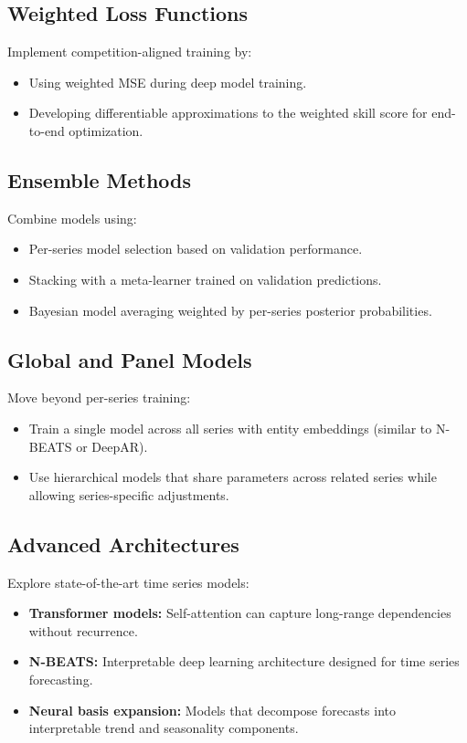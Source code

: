 \subsection{Weighted Loss Functions}
Implement competition-aligned training by:
\begin{itemize}
    \item Using weighted MSE during deep model training.
    \item Developing differentiable approximations to the weighted skill score for end-to-end optimization.
\end{itemize}

\subsection{Ensemble Methods}
Combine models using:
\begin{itemize}
    \item Per-series model selection based on validation performance.
    \item Stacking with a meta-learner trained on validation predictions.
    \item Bayesian model averaging weighted by per-series posterior probabilities.
\end{itemize}

\subsection{Global and Panel Models}
Move beyond per-series training:
\begin{itemize}
    \item Train a single model across all series with entity embeddings (similar to N-BEATS or DeepAR).
    \item Use hierarchical models that share parameters across related series while allowing series-specific adjustments.
\end{itemize}

\subsection{Advanced Architectures}
Explore state-of-the-art time series models:
\begin{itemize}
    \item \textbf{Transformer models:} Self-attention can capture long-range dependencies without recurrence.
    \item \textbf{N-BEATS:} Interpretable deep learning architecture designed for time series forecasting.
    \item \textbf{Neural basis expansion:} Models that decompose forecasts into interpretable trend and seasonality components.
\end{itemize}

